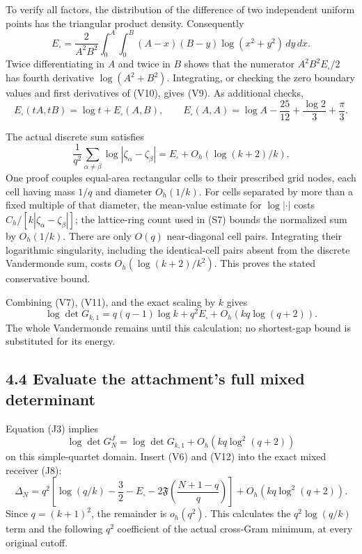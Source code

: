 To verify all factors, the distribution of the difference of two independent uniform points has the triangular product density. Consequently \[
 E_\square=\frac{2}{A^2B^2}
 \int_0^A\int_0^B(A-x)(B-y)\log(x^2+y^2)\,dy\,dx. \tag{V10}
\] Twice differentiating in \(A\) and twice in \(B\) shows that the numerator \(A^2B^2E_\square/2\) has fourth derivative \(\log(A^2+B^2)\). Integrating, or checking the zero boundary values and first derivatives of (V10), gives (V9). As additional checks, \[
 E_\square(tA,tB)=\log t+E_\square(A,B),\qquad
 E_\square(A,A)=\log A-\frac{25}{12}+\frac{\log2}{3}+\frac{\pi}{3}.
\]

The actual discrete sum satisfies \[
 \frac1{q^2}\sum_{\alpha\ne\beta}
 \log|\zeta_\alpha-\zeta_\beta|
 =E_\square+O_h(\log(k+2)/k). \tag{V11}
\] One proof couples equal-area rectangular cells to their prescribed grid nodes, each cell having mass \(1/q\) and diameter \(O_h(1/k)\). For cells separated by more than a fixed multiple of that diameter, the mean-value estimate for \(\log|\cdot|\) costs \(C_h/[k|\zeta_\alpha-\zeta_\beta|]\); the lattice-ring count used in (S7) bounds the normalized sum by \(O_h(1/k)\). There are only \(O(q)\) near-diagonal cell pairs. Integrating their logarithmic singularity, including the identical-cell pairs absent from the discrete Vandermonde sum, costs \(O_h(\log(k+2)/k^2)\). This proves the stated conservative bound.

Combining (V7), (V11), and the exact scaling by \(k\) gives \[
 \log\det G_{k,1}
 =q(q-1)\log k+q^2E_\square+O_h(kq\log(q+2)). \tag{V12}
\] The whole Vandermonde remains until this calculation; no shortest-gap bound is substituted for its energy.

\subsection{4.4 Evaluate the attachment's full mixed determinant}\label{evaluate-the-attachments-full-mixed-determinant}

Equation (J3) implies \[
 \log\det G_N^J
 =\log\det G_{k,1}+O_h(kq\log^2(q+2))
\] on this simple-quartet domain. Insert (V6) and (V12) into the exact mixed receiver (J8): \[
 \boxed{
 \Delta_N
 =q^2\left[
 \log(q/k)-\frac32-E_\square
 -2\mathfrak F\!\left(\frac{N+1-q}{q}\right)
 \right]
 +O_h(kq\log^2(q+2)).
 } \tag{V13}
\] Since \(q=(k+1)^2\), the remainder is \(o_h(q^2)\). This calculates the \(q^2\log(q/k)\) term and the following \(q^2\) coefficient of the actual cross-Gram minimum, at every original cutoff.


